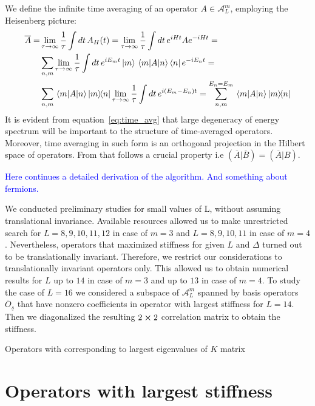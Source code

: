   We define the infinite time averaging of an operator \(A\in \mathcal{A}_L^m\), employing the Heisenberg picture:
  \begin{align}
  \overline{A} = &\lim_{\tau \rightarrow \infty} \frac{1}{\tau} \int dt\, A_{H}(t) =  \nonumber
  \lim_{\tau \rightarrow \infty} \frac{1}{\tau} \int dt\, e^{i H t}A e^{-i H t} = \\ \nonumber
  &\sum_{n,m} \lim_{\tau \rightarrow \infty} \frac{1}{\tau} \int dt\, e^{i E_m t}\ket{m}  
  \matrixel{m}{A}{n}\bra{n}  e^{-i E_n t} = \\ 
  & \sum_{n,m} \matrixel{m}{A}{n}\ketbra{m}{n} \lim_{\tau \rightarrow \infty} \frac{1}{\tau}
  \int dt \, e^{i(E_m-E_n)t} =  \sum_{n,m}^{E_n = E_m} \matrixel{m}{A}{n}\ketbra{m}{n}
  \label{eq:time_avg}
  \end{align}
  It is evident from equation~\eqref{eq:time_avg} that large degeneracy of energy spectrum will be important to the
  structure of time-averaged operators. Moreover, time averaging in such form is an orthogonal projection in the
  Hilbert space of operators. From that follows a crucial property i.e \(\left(\overline{A}|\overline{B}\right) = 
  \left(\overline{A}|B\right)\).
  
  \textcolor{blue}{Here continues a detailed derivation of the algorithm. And something about fermions.}
  
  We conducted preliminary studies for small values of L, without assuming translational invariance. Available resources
  allowed us to make unrestricted search for \(L = 8,9,10,11,12\) in case of \(m = 3\) and \(L = 8,9,10,11\) in case of
  \(m = 4\). Nevertheless, operators that maximized stiffness for given \(L\) and \(\Delta\) turned out to be translationally
  invariant. Therefore, we restrict our considerations to translationally invariant operators only. This allowed us
  to obtain numerical results for \(L\) up to \(14\) in case of \(m = 3\) and up to \(13\) in case of \(m = 4\).
  To study the case of  \(L = 16\) we considered a subspace of \(\mathcal{A}_L^m\) spanned by basis operators
  \(\overline{O}_{\underline{s}}\) that have nonzero coefficients in operator with largest stiffness for \(L = 14\). 
  Then we diagonalized the resulting \(2\cross 2\) correlation matrix to obtain the stiffness.
  
  Operators with corresponding to largest eigenvalues of \(K\) matrix 
  
\section{Operators with largest stiffness}

